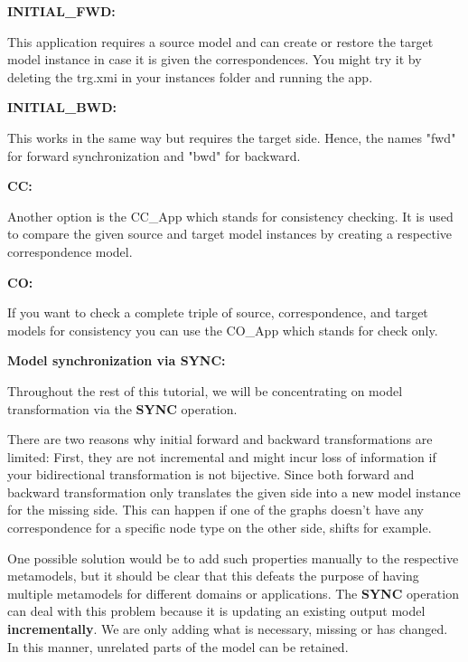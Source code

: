 \textbf{INITIAL\_FWD:}

This application requires a source model and can create or restore the target model instance in case it is given the correspondences. You might try it by deleting the \textsf{trg.xmi} in your instances folder and running the app.\newline

\textbf{INITIAL\_BWD:}

This works in the same way but requires the target side. Hence, the names \textsf{"fwd"} for forward synchronization and \textsf{"bwd"} for backward.\newline

\textbf{CC:}

Another option is the \textsf{CC\_App} which stands for consistency checking. It is used to compare the given source and target model instances by creating a respective correspondence model. \newline

\textbf{CO:}

If you want to check a complete triple of source, correspondence, and target models for consistency you can use the \textsf{CO\_App} which stands for check only. \newline

\clearpage

\textbf{Model synchronization via SYNC:}

Throughout the rest of this tutorial, we will be concentrating on model transformation via the \textbf{SYNC} operation. 

There are two reasons why initial forward and backward transformations are limited: First, they are not incremental and might incur loss of information if your bidirectional transformation is not bijective. Since both forward and backward transformation only translates the given side into a new model instance for the missing side. This can happen if one of the graphs doesn't have any correspondence for a specific node type on the other side, shifts for example.\newline

One possible solution would be to add such properties manually to the respective metamodels, but it should be clear that this defeats the purpose of having multiple metamodels for different domains or applications. The \textbf{SYNC} operation can deal with this problem because it is updating an existing output model \textbf{incrementally}. We are only adding what is necessary, missing or has changed. In this manner, unrelated parts of the model can be retained.\newline

